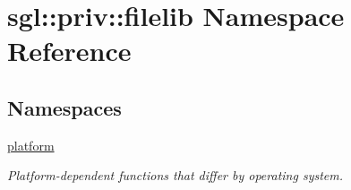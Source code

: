 \hypertarget{namespacesgl_1_1priv_1_1filelib}{}\section{sgl\+:\+:priv\+:\+:filelib Namespace Reference}
\label{namespacesgl_1_1priv_1_1filelib}
\subsection*{Namespaces}
\begin{DoxyCompactItemize}
\item 
 \mbox{\hyperlink{namespacesgl_1_1priv_1_1filelib_1_1platform}{platform}}
\begin{DoxyCompactList}\small\item\em Platform-\/dependent functions that differ by operating system. \end{DoxyCompactList}\end{DoxyCompactItemize}

